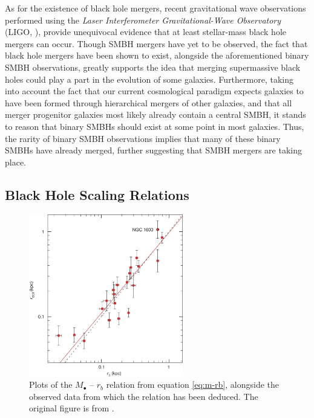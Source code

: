 \documentclass[english, twoside]{HYgradu}
\begin{document}
As for the existence of black hole mergers, recent gravitational wave observations performed using the \textit{Laser Interferometer Gravitational-Wave Observatory} (LIGO, \citealt{Abbott2016, Abbott2019}), provide unequivocal evidence that at least stellar-mass black hole mergers can occur. Though SMBH mergers have yet to be observed, the fact that black hole mergers have been shown to exist, alongside the aforementioned binary SMBH observations, greatly supports the idea that merging supermassive black holes could play a part in the evolution of some galaxies. Furthermore, taking into account the fact that our current cosmological paradigm expects galaxies to have been formed through hierarchical mergers of other galaxies, and that all merger progenitor galaxies most likely already contain a central SMBH, it stands to reason that binary SMBHs should exist at some point in most galaxies. Thus, the rarity of binary SMBH observations implies that many of these binary SMBHs have already merged, further suggesting that SMBH mergers are taking place.

\subsection{Black Hole Scaling Relations} \label{section:scaling_relation}

\begin{figure}
	\centering
	\includegraphics[width=0.6\textwidth]{thomas_mbh-rb.png}
	\caption{Plots of the $M_\bullet$ – $r_b$ relation from equation \ref{eq:m-rb}, alongside the observed data from which the relation has been deduced. The original figure is from \cite{Thomas2016}.}
	\label{figure:m-rb}
\end{figure}
\end{document}

